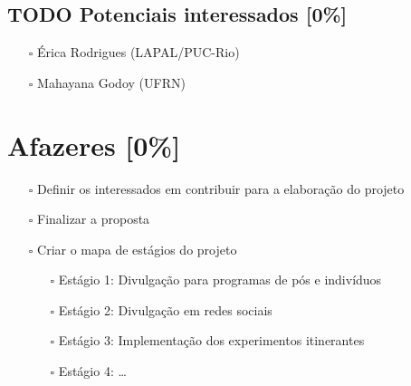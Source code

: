 \documentclass[11pt]{article}
\begin{document}
\subsection{{\bfseries\sffamily TODO} Potenciais interessados [0\%]}
\label{sec:org8c6fbc7}
\begin{itemize}
\item[{$\square$}] Érica Rodrigues (LAPAL/PUC-Rio)
\item[{$\square$}] Mahayana Godoy (UFRN)
\end{itemize}

\section{Afazeres [0\%]}
\label{sec:org503bbe4}
\begin{itemize}
\item[{$\square$}] Definir os interessados em contribuir para a elaboração do projeto
\item[{$\square$}] Finalizar a proposta
\item[{$\square$}] Criar o mapa de estágios do projeto
\begin{itemize}
\item[{$\square$}] Estágio 1: Divulgação para programas de pós e indivíduos
\item[{$\square$}] Estágio 2: Divulgação em redes sociais
\item[{$\square$}] Estágio 3: Implementação dos experimentos itinerantes
\item[{$\square$}] Estágio 4: …
\end{itemize}
\end{itemize}
\end{document}
